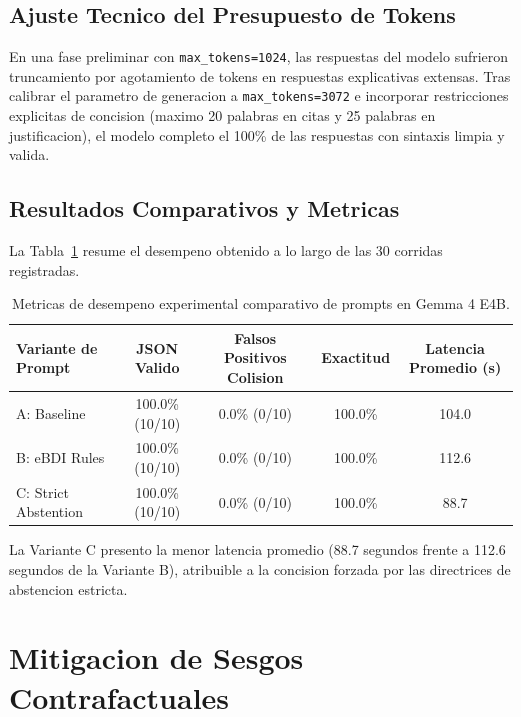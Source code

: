 \documentclass[11pt,a4paper]{article}
\begin{document}
\subsection{Ajuste Tecnico del Presupuesto de Tokens}
En una fase preliminar con \texttt{max\_tokens=1024}, las respuestas del modelo sufrieron truncamiento por agotamiento de tokens en respuestas explicativas extensas. Tras calibrar el parametro de generacion a \texttt{max\_tokens=3072} e incorporar restricciones explicitas de concision (maximo 20 palabras en citas y 25 palabras en justificacion), el modelo completo el 100\% de las respuestas con sintaxis limpia y valida.

\subsection{Resultados Comparativos y Metricas}
La Tabla~\ref{tab:prompt_metrics} resume el desempeno obtenido a lo largo de las 30 corridas registradas.

\begin{table}[H]
\centering
\small
\begin{tabularx}{\textwidth}{lcccc}
\toprule
\textbf{Variante de Prompt} & \textbf{JSON Valido} & \textbf{Falsos Positivos Colision} & \textbf{Exactitud} & \textbf{Latencia Promedio (s)} \\
\midrule
A: Baseline & 100.0\% (10/10) & 0.0\% (0/10) & 100.0\% & 104.0 \\
B: eBDI Rules & 100.0\% (10/10) & 0.0\% (0/10) & 100.0\% & 112.6 \\
C: Strict Abstention & 100.0\% (10/10) & 0.0\% (0/10) & 100.0\% & 88.7 \\
\bottomrule
\end{tabularx}
\caption{Metricas de desempeno experimental comparativo de prompts en Gemma 4 E4B.}
\label{tab:prompt_metrics}
\end{table}

La Variante C presento la menor latencia promedio (88.7 segundos frente a 112.6 segundos de la Variante B), atribuible a la concision forzada por las directrices de abstencion estricta.

\section{Mitigacion de Sesgos Contrafactuales}
\end{document}
